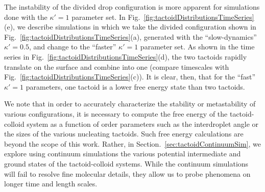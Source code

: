 \documentclass[%
 aip,
 amsmath,amssymb,
 reprint,%
]{revtex4-1}
\begin{document}
The instability of the divided drop configuration is more apparent for simulations done with the $\kappa'=1$ parameter set. In Fig.~\ref{fig:tactoidDistributionsTimeSeries}(e), we describe simulations in which we take the divided configuration shown in Fig.~\ref{fig:tactoidDistributionsTimeSeries}(a), generated with the ``slow-dynamics'' $\kappa'=0.5$, and change to the ``faster'' $\kappa'=1$ parameter set. As shown in the time series in Fig.~\ref{fig:tactoidDistributionsTimeSeries}(d), the two tactoids rapidly translate on the surface and combine into one (compare timescales with Fig.~\ref{fig:tactoidDistributionsTimeSeries}(c)). It is clear, then, that for the ``fast'' $\kappa'=1$ parameters, one tactoid is a lower free energy state than two tactoids. %


We note that in order to accurately characterize the stability or metastability of various configurations, it is necessary to compute the free energy of the tactoid-colloid system as a function of order parameters such as the interdroplet angle or the sizes of the various nucleating tactoids. Such free energy calculations are beyond the scope of this work. Rather, in Section.~\ref{sec:tactoidContinuumSim}, we explore using continuum simulations the various potential intermediate and ground states of the tactoid-colloid systems. While the continuum simulations will fail to resolve fine molecular details, they allow us to probe phenomena on longer time and length scales. 

\end{document}
